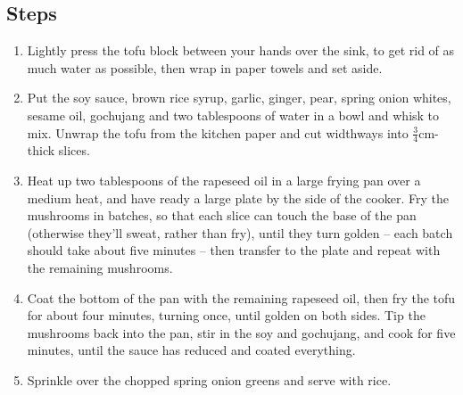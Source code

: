 \documentclass{book}
\begin{document}
\subsection*{Steps}
\begin{enumerate}
\item Lightly press the tofu block between your hands over the sink, to get rid of as much water as possible, then wrap in paper towels and set aside.
\item Put the soy sauce, brown rice syrup, garlic, ginger, pear, spring onion whites, sesame oil, gochujang and two tablespoons of water in a bowl and whisk to mix. Unwrap the tofu from the kitchen paper and cut widthways into $\frac{3}{4}$cm-thick slices.
\item Heat up two tablespoons of the rapeseed oil in a large frying pan over a medium heat, and have ready a large plate by the side of the cooker. Fry the mushrooms in batches, so that each slice can touch the base of the pan (otherwise they’ll sweat, rather than fry), until they turn golden – each batch should take about five minutes – then transfer to the plate and repeat with the remaining mushrooms.
\item Coat the bottom of the pan with the remaining rapeseed oil, then fry the tofu for about four minutes, turning once, until golden on both sides. Tip the mushrooms back into the pan, stir in the soy and gochujang, and cook for five minutes, until the sauce has reduced and coated everything.
\item Sprinkle over the chopped spring onion greens and serve with rice.
\end{enumerate}
\newpage
\end{document}
